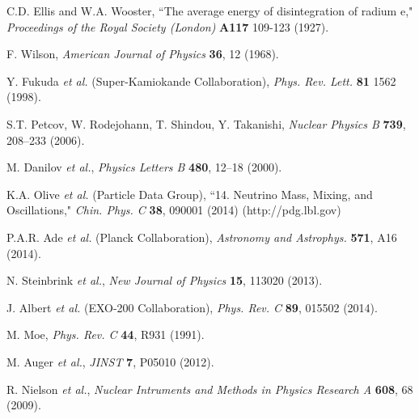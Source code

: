 \documentclass[PhD, copyrightpage]{csuthesis} %
\begin{document}
%


% 
% 
% 
% 
\newpage
 \begin{thebibliography}{00}
 
  C.D. Ellis and W.A. Wooster, ``The average energy of disintegration of radium e," \emph{Proceedings of the Royal Society (London)} \textbf{A117} 109-123 (1927).
 
  F. Wilson, \emph{American Journal of Physics} \textbf{36}, 12 (1968).
 
  Y. Fukuda \emph{et al.} (Super-Kamiokande Collaboration), \emph{Phys. Rev. Lett.} \textbf{81} 1562 (1998).
 
  S.T. Petcov, W. Rodejohann, T. Shindou, Y. Takanishi, \emph{Nuclear Physics B} \textbf{739}, 208–233 (2006).

  M. Danilov \emph{et al.}, \emph{Physics Letters B} \textbf{480}, 12–18 (2000).
 
  K.A. Olive \emph{et al.} (Particle Data Group), ``14. Neutrino Mass, Mixing, and Oscillations," \emph{Chin. Phys. C} \textbf{38}, 090001 (2014) (http://pdg.lbl.gov)
 
  P.A.R. Ade \emph{et al.} (Planck Collaboration), \emph{Astronomy and Astrophys.} \textbf{571}, A16 (2014).
 
  N. Steinbrink \emph{et al.}, \emph{New Journal of Physics} \textbf{15}, 113020 (2013).
 
  J. Albert \emph{et al.} (EXO-200 Collaboration), \emph{Phys. Rev. C} \textbf{89}, 015502 (2014).
 
  M. Moe, \emph{Phys. Rev. C} \textbf{44}, R931 (1991).
 
  M. Auger \emph{et al.}, \emph{JINST} \textbf{7}, P05010 (2012).
 
  R. Nielson \emph{et al.}, \emph{Nuclear Intruments and Methods in Physics Research A} \textbf{608}, 68 (2009).
 

\end{thebibliography}
\end{document}
